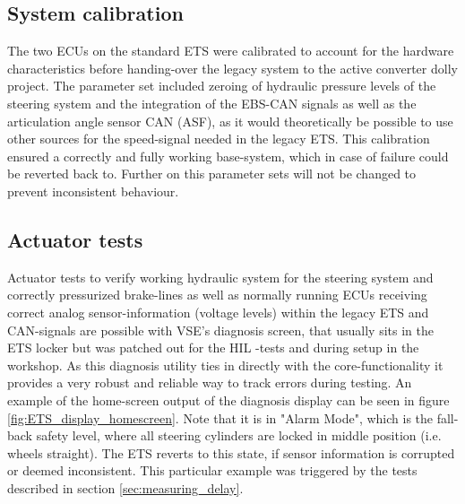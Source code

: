 \documentclass[ExampleMasters.tex]{subfiles}
\begin{document}
\subsection{System calibration}

The two \gls{ECU}s on the standard \gls{ETS} were calibrated to account for the hardware characteristics before handing-over the legacy system to the active converter dolly project. The parameter set included zeroing of hydraulic pressure levels of the steering system and the integration of the \gls{EBS}-\gls{CAN} signals as well as the articulation angle sensor \gls{CAN} (\gls{ASF}), as it would theoretically be possible to use other sources for the speed-signal needed in the legacy \gls{ETS}. This calibration ensured a correctly and fully working base-system, which in case of failure could be reverted back to. Further on this parameter sets will not be changed to prevent inconsistent behaviour. 

\subsection{Actuator tests}

Actuator tests to verify working hydraulic system for the steering system and correctly pressurized brake-lines as well as normally running \gls{ECU}s receiving correct analog sensor-information (voltage levels) within the legacy \gls{ETS} and \gls{CAN}-signals are possible with \gls{VSE}'s diagnosis screen, that usually sits in the \gls{ETS} locker but was patched out for the \gls{HIL} -tests and during setup in the workshop. As this diagnosis utility ties in directly with the core-functionality it provides a very robust and reliable way to track errors during testing. An example of the home-screen output of the diagnosis display can be seen in figure \ref{fig:ETS_display_homescreen}. Note that it is in "Alarm Mode", which is the fall-back safety level, where all steering cylinders are locked in middle position (i.e. wheels straight). The \gls{ETS} reverts to this state, if sensor information is corrupted or deemed inconsistent. This particular example was triggered by the tests described in section \ref{sec:measuring_delay}.
\end{document}
